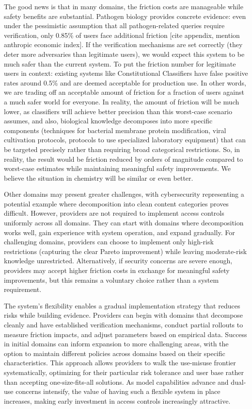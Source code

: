 \documentclass{article}
\theoremstyle{plain}
\theoremstyle{definition}
\theoremstyle{remark}
\begin{document}
The good news is that in many domains, the friction costs are manageable while safety benefits are substantial.
Pathogen biology provides concrete evidence: even under the pessimistic assumption that all pathogen-related queries require verification, only 0.85\% of users face additional friction [cite appendix, mention anthropic economic index].
If the verification mechanisms are set correctly (they deter more adversaries than legitimate users), we would expect this system to be much safer than the current system.
To put the friction number for legitimate users in context: existing systems like Constitutional Classifiers have false positive rates around 0.5\% and are deemed acceptable for production use.
In other words, we are trading off an acceptable amount of friction for a fraction of users against a much safer world for everyone.
In reality, the amount of friction will be much lower, as classifiers will achieve better precision than this worst-case scenario assumes, and also, biological knowledge decomposes into more specific components (techniques for bacterial membrane protein modification, viral cultivation protocols, protocols to use specialized laboratory equipment) that can be targeted precisely rather than requiring broad categorical restrictions.
So, in reality, the result would be friction reduced by orders of magnitude compared to worst-case estimates while maintaining meaningful safety improvements.
We believe the situation in chemistry will be similar or even better.

Other domains may present greater challenges, with cybersecurity representing a potential example where decomposition into clean content categories proves difficult.
However, providers are not required to implement access controls uniformly across all domains.
They can start with domains where decomposition works well, gain experience with system operation, and expand gradually.
For challenging domains, providers can choose to implement only high-risk restrictions (capturing the clear Pareto improvement) while leaving moderate-risk knowledge unrestricted.
Alternatively, if security concerns are severe enough, providers may accept higher friction costs in exchange for meaningful safety improvements, but this remains a voluntary choice rather than a system requirement.

The system's flexibility enables a gradual implementation strategy that reduces risks while building evidence.
Providers can begin with domains that decompose cleanly and have established verification mechanisms, conduct partial rollouts to measure friction impacts, and adjust parameters based on empirical data.
Success in initial domains can inform expansion to more challenging areas, with the option to maintain different policies across domains based on their specific characteristics.
This approach allows providers to walk the use-misuse frontier systematically, optimizing for their particular risk tolerance and user base rather than accepting one-size-fits-all solutions.
As model capabilities advance and dual-use concerns intensify, the value of having such a flexible system in place increases, making early investment in access controls increasingly attractive.
\end{document}
